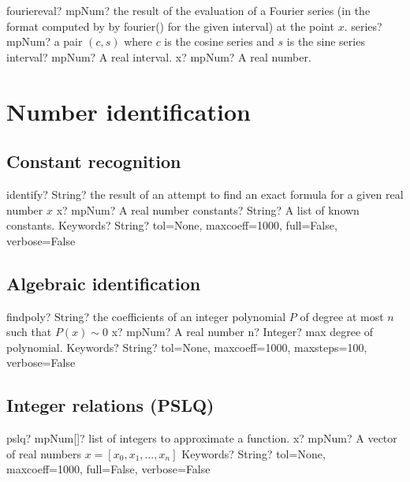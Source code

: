 \documentclass[12pt,a4paper,openany]{book}
\begin{document}
\begin{mpFunctionsExtract}
\mpFunctionThree
{fouriereval? mpNum? the result of the evaluation of a Fourier series (in the format computed by by fourier() for the given interval) at the point $x$.}
{series? mpNum? a pair $(c,s)$ where $c$ is the cosine series and $s$ is the sine series}
{interval? mpNum? A real interval.}
{x? mpNum? A real number.}
\end{mpFunctionsExtract}

\chapter{Number identification}

\section{Constant recognition}

\begin{mpFunctionsExtract}
\mpFunctionThree
{identify? String? the result of an attempt to find an exact formula for a given real number $x$}
{x? mpNum? A real number}
{constants? String? A list of known constants.}
{Keywords? String?  tol=None, maxcoeff=1000, full=False, verbose=False}
\end{mpFunctionsExtract}

\section{Algebraic identification}

\begin{mpFunctionsExtract}
\mpFunctionThree
{findpoly? String? the coefficients of an integer polynomial $P$ of degree at most $n$ such that $P(x) \sim 0$}
{x? mpNum? A real number}
{n? Integer? max degree of polynomial.}
{Keywords? String?  tol=None, maxcoeff=1000, maxsteps=100, verbose=False}
\end{mpFunctionsExtract}

\section{Integer relations (PSLQ)}

\begin{mpFunctionsExtract}
\mpFunctionTwo
{pslq? mpNum[]? list of integers to approximate a function.}
{x? mpNum? A vector of real numbers $x=[x_0,x_1,\ldots,x_n]$}
{Keywords? String?  tol=None, maxcoeff=1000, full=False, verbose=False}
\end{mpFunctionsExtract}
\end{document}
